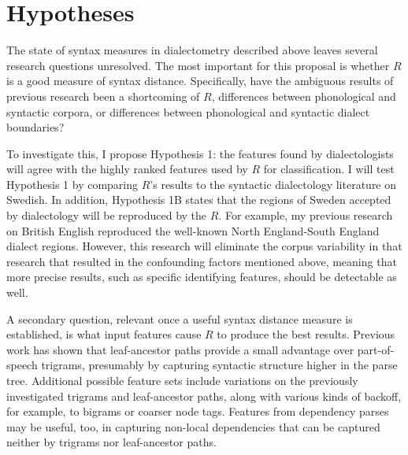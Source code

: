 


\section{Hypotheses}
The state of syntax measures in dialectometry described above leaves
several research questions unresolved. The most important for this
proposal is whether $R$ is a good measure of syntax
distance. Specifically, have the ambiguous results of previous
research been a shortcoming of $R$, differences between phonological
and syntactic corpora, or differences between phonological and
syntactic dialect boundaries?

To investigate this, I propose Hypothesis 1: the features found by
dialectologists will agree with the highly ranked features used by $R$
for classification. I will test Hypothesis 1 by comparing $R$'s
results to the syntactic dialectology literature on Swedish. In
addition, Hypothesis 1B states that the regions of Sweden accepted by
dialectology will be reproduced by the $R$. For example, my
previous research on British English reproduced the well-known North
England-South England dialect regions. However, this research will eliminate the
corpus variability in that research \cite{sanders08b} that resulted in
the confounding factors mentioned above, meaning that more precise
results, such as specific identifying features, should be detectable as well.

A secondary question, relevant once a useful syntax distance measure
is established, is what input features cause $R$ to produce the best
results.  Previous work has shown that leaf-ancestor paths provide a
small advantage over part-of-speech trigrams, presumably by capturing
syntactic structure higher in the parse tree. Additional possible
feature sets include variations on the previously investigated
trigrams and leaf-ancestor paths, along with various kinds of backoff,
for example, to bigrams or coarser node tags. Features from dependency
parses may be useful, too, in capturing non-local dependencies that
can be captured neither by trigrams nor leaf-ancestor paths.

